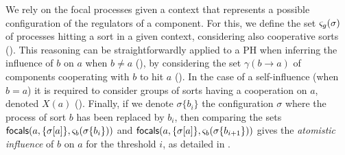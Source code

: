 \begin{comment}
Given a set $g$ of components and a configuration (\ie a sub-state) $\sigma$, $\ctx_g(\sigma)$
refers to the set of processes hitting $a$ regulated by any sort in $g$ (\pref{eq:ctx-sigma}).
If $g=\{b\}$, we simple note $\ctx_b(\sigma)$.
This set is composed of the active processes of sorts in $g$, and the focal process (assumed
unique) of the cooperative sorts $\upsilon$ hitting $a$ that have a predecessor in $g$.
The evaluation of the focal process of $\upsilon$ in context $\sigma$, denoted $\upsilon(\sigma)$,
relies on \pref{pro:wf-cooperative-sort}, which gives its value when all the direct predecessors of
$\upsilon$ are defined in $\sigma$.
When a predecessor $\upsilon'$ is not in $\sigma$, we extend the evaluation by recursively computing
the focal value of $\upsilon'$ is $\sigma$, as stated in \pref{eq:cooperative-eval}.
Because there is no cycle between cooperative sorts, this recursive evaluation of $\upsilon(\sigma)$
always terminates.
\end{comment}

We rely on the focal processes given a context that represents a possible configuration of the regulators of a component.
For this, we define the set $\varsigma_g(\sigma)$ of processes hitting a sort in a given context, considering also cooperative sorts ().
This reasoning can be straightforwardly applied to a PH when inferring the influence of $b$ on $a$
when $b\neq a$ (), by considering the set $\gamma(b\rightarrow a)$ of components cooperating with $b$ to hit $a$ (). In the case of a self-influence (when $b = a$) it is required to consider groups of sorts having a cooperation on $a$, denoted $X(a)$ (). Finally, if we denote $\sigma\{b_i\}$ the configuration $\sigma$ where the process of sort $b$ has been replaced
by $b_i$, then comparing the sets $\mathsf{focals}(a, \{\sigma[a]\}, \varsigma_b(\sigma\{b_i\}))$ and $\mathsf{focals}(a, \{\sigma[a]\}, \varsigma_b(\sigma\{b_{i+1}\}))$ gives the \emph{atomistic influence} of $b$ on $a$ for the threshold $i$, as detailed in .


